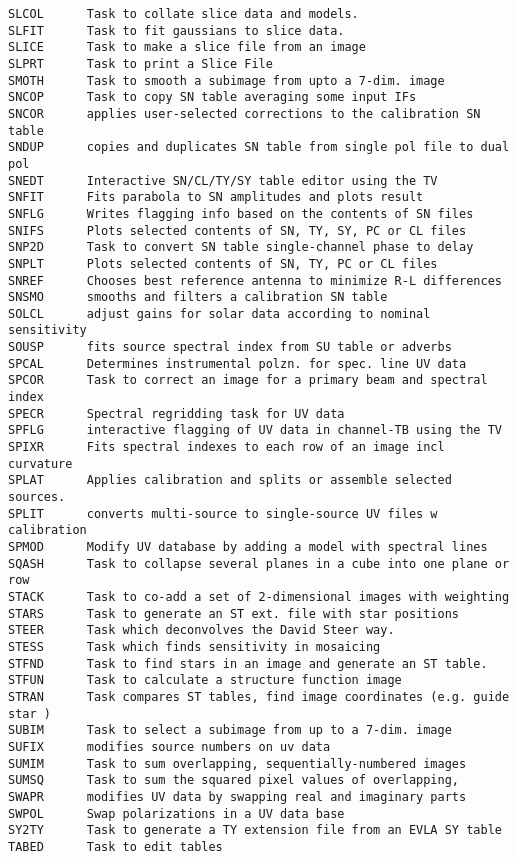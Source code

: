 \begin{verbatim}
SLCOL      Task to collate slice data and models.
SLFIT      Task to fit gaussians to slice data.
SLICE      Task to make a slice file from an image
SLPRT      Task to print a Slice File
SMOTH      Task to smooth a subimage from upto a 7-dim. image
SNCOP      Task to copy SN table averaging some input IFs
SNCOR      applies user-selected corrections to the calibration SN table
SNDUP      copies and duplicates SN table from single pol file to dual pol
SNEDT      Interactive SN/CL/TY/SY table editor using the TV
SNFIT      Fits parabola to SN amplitudes and plots result
SNFLG      Writes flagging info based on the contents of SN files
SNIFS      Plots selected contents of SN, TY, SY, PC or CL files
SNP2D      Task to convert SN table single-channel phase to delay
SNPLT      Plots selected contents of SN, TY, PC or CL files
SNREF      Chooses best reference antenna to minimize R-L differences
SNSMO      smooths and filters a calibration SN table
SOLCL      adjust gains for solar data according to nominal sensitivity
SOUSP      fits source spectral index from SU table or adverbs
SPCAL      Determines instrumental polzn. for spec. line UV data
SPCOR      Task to correct an image for a primary beam and spectral index
SPECR      Spectral regridding task for UV data
SPFLG      interactive flagging of UV data in channel-TB using the TV
SPIXR      Fits spectral indexes to each row of an image incl curvature
SPLAT      Applies calibration and splits or assemble selected sources.
SPLIT      converts multi-source to single-source UV files w calibration
SPMOD      Modify UV database by adding a model with spectral lines
SQASH      Task to collapse several planes in a cube into one plane or row
STACK      Task to co-add a set of 2-dimensional images with weighting
STARS      Task to generate an ST ext. file with star positions
STEER      Task which deconvolves the David Steer way.
STESS      Task which finds sensitivity in mosaicing
STFND      Task to find stars in an image and generate an ST table.
STFUN      Task to calculate a structure function image
STRAN      Task compares ST tables, find image coordinates (e.g. guide star )
SUBIM      Task to select a subimage from up to a 7-dim. image
SUFIX      modifies source numbers on uv data
SUMIM      Task to sum overlapping, sequentially-numbered images
SUMSQ      Task to sum the squared pixel values of overlapping,
SWAPR      modifies UV data by swapping real and imaginary parts
SWPOL      Swap polarizations in a UV data base
SY2TY      Task to generate a TY extension file from an EVLA SY table
TABED      Task to edit tables

\end{verbatim}
